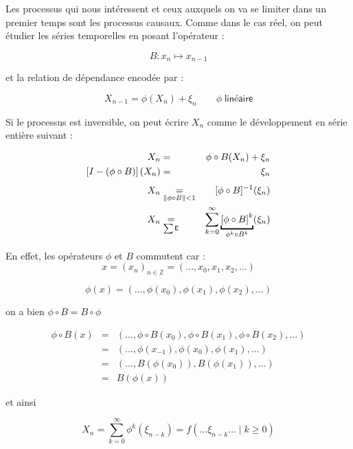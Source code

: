 \bigskip

Les processus qui nous intéressent et ceux auxquels on va se limiter dans un premier temps sont les processus causaux. Comme dans le cas réel, on peut étudier les séries temporelles en posant l'opérateur :

$$B : x_n \mapsto x_{n-1}$$

et la relation de dépendance encodée par :

$$X_{n-1} = \phi(X_n) + \xi_n \qquad \phi \; \textsf{linéaire}$$

Si le processus est inversible, on peut écrire $X_n$ comme le développement en série entière suivant :

\begin{align*}
    X_n                                  & =                                         & \phi \circ B(X_n) + \xi_n                                                                       \\
    \left[I - (\phi \circ B)\right](X_n) & \underset{\textsf{}} =                    & \xi_n
    \\
    X_n                                  & \underset{\Vert \phi \circ B \Vert < 1} = & \inverse{[\phi \circ B]} (\xi_n)
    \\
    X_n                                  & \underset{\sum \textsf{E}} =              & \sum\limits_{k=0}^\infty \underbracket{\left[ \phi \circ B \right]^k}_{\phi^k \circ B^k}(\xi_n)
\end{align*}


En effet, les opérateurs $\phi$ et $B$ commutent car :
$$x = (x_n)_{n \in \mathds Z} = (\dots , x_0, x_1, x_2, \dots)$$

$$\phi(x) = (\dots , \phi(x_0), \phi(x_1), \phi(x_2), \dots)$$

on a bien $\phi \circ B = B \circ \phi$

\begin{align*}
    \phi \circ B(x) & = & (\dots , \phi \circ B(x_0), \phi \circ B(x_1), \phi \circ B(x_2), \dots)
    \\
                    & = & (\dots, \phi(x_{-1}), \phi(x_0), \phi(x_1), \dots)
    \\
                    & = & (\dots, B\left(\phi(x_0)\right) , B(\phi(x_1)),\dots)
    \\
                    & = & B\left( \phi(x) \right)
\end{align*}


et ainsi

$$
    \boxed{
        X_n = \sum\limits_{k=0}^\infty \phi^k( \xi_{n-k} ) = f( \dots \xi_{n-k} \dots \; | \; k \geq 0)
    }
$$
